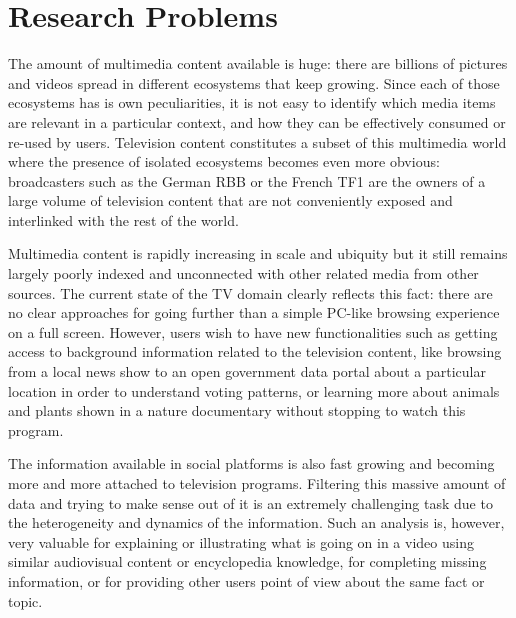 \documentclass[a4paper,11pt]{report}
\begin{document}
\chapter{Research Problems}
The amount of multimedia content available is huge: there are billions of pictures and videos spread in different ecosystems that keep growing. Since each of those ecosystems has is own peculiarities, it is not easy to identify which media items are relevant in a particular context, and how they can be effectively consumed or re-used by users. Television content constitutes a subset of this multimedia world where the presence of isolated ecosystems becomes even more obvious: broadcasters such as the German RBB or the French TF1 are the owners of a large volume of television content that are not conveniently exposed and interlinked with the rest of the world.

Multimedia content is rapidly increasing in scale and ubiquity but it still remains largely poorly indexed and unconnected with other related media from other sources. The current state of the TV domain clearly reflects this fact: there are no clear approaches for going further than a simple PC-like browsing experience on a full screen. However, users wish to have new functionalities such as getting access to background information related to the television content, like browsing from a local news show to an open government data portal about a particular location in order to understand voting patterns, or learning more about animals and plants shown in a nature documentary without stopping to watch this program.

The information available in social platforms is also fast growing and becoming more and more attached to television programs. Filtering this massive amount of data and trying to make sense out of it is an extremely challenging task due to the heterogeneity and dynamics of the information. Such an analysis is, however, very valuable for explaining or illustrating what is going on in a video using similar audiovisual content or encyclopedia knowledge, for completing missing information, or for providing other users point of view about the same fact or topic.
\end{document}
